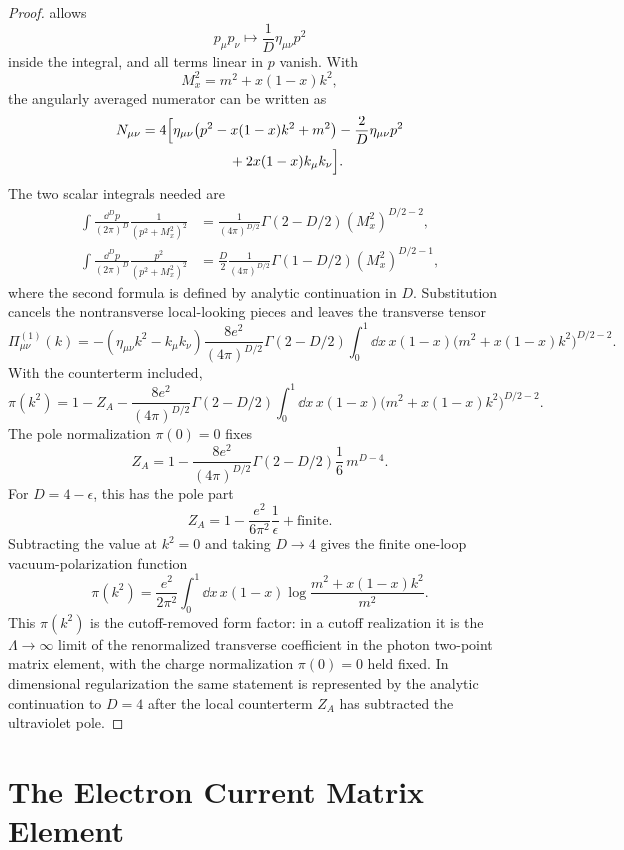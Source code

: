 \begin{proof}
allows
\[
  p_\mu p_\nu\mapsto \frac1D\eta_{\mu\nu}p^2
\]
inside the integral, and all terms linear in \(p\) vanish.  With
\[
  M_x^2=m^2+x(1-x)k^2,
\]
the angularly averaged numerator can be written as
\[
\begin{aligned}
  N_{\mu\nu}
  =
  4\Bigl[
    &\eta_{\mu\nu}\bigl(p^2-x(1-x)k^2+m^2\bigr)
    -\frac2D\eta_{\mu\nu}p^2
\\
    &\qquad\qquad
    +2x(1-x)k_\mu k_\nu
  \Bigr].
\end{aligned}
\]
The two scalar integrals needed are
\[
\begin{aligned}
  \int\frac{\dd^Dp}{(2\pi)^D}\frac1{(p^2+M_x^2)^2}
  &=
  \frac1{(4\pi)^{D/2}}
  \Gamma(2-D/2)(M_x^2)^{D/2-2},\\
  \int\frac{\dd^Dp}{(2\pi)^D}\frac{p^2}{(p^2+M_x^2)^2}
  &=
  \frac{D}{2}\frac1{(4\pi)^{D/2}}
  \Gamma(1-D/2)(M_x^2)^{D/2-1},
\end{aligned}
\]
where the second formula is defined by analytic continuation in \(D\).
Substitution cancels the nontransverse local-looking pieces and leaves the
transverse tensor
\[
  \Pi^{(1)}_{\mu\nu}(k)
  =
  -(\eta_{\mu\nu}k^2-k_\mu k_\nu)
  \frac{8e^2}{(4\pi)^{D/2}}
  \Gamma(2-D/2)
  \int_0^1\dd x\,x(1-x)
  \bigl(m^2+x(1-x)k^2\bigr)^{D/2-2}.
\]
With the counterterm included,
\[
  \pi(k^2)
  =
  1-Z_A
  -
  \frac{8e^2}{(4\pi)^{D/2}}\Gamma(2-D/2)
  \int_0^1\dd x\,x(1-x)
  \bigl(m^2+x(1-x)k^2\bigr)^{D/2-2}.
\]
The pole normalization \(\pi(0)=0\) fixes
\[
  Z_A
  =
  1-
  \frac{8e^2}{(4\pi)^{D/2}}\Gamma(2-D/2)\frac16\,m^{D-4}.
\]
For \(D=4-\epsilon\), this has the pole part
\[
  Z_A=1-\frac{e^2}{6\pi^2}\frac1\epsilon+\text{finite}.
\]
Subtracting the value at \(k^2=0\) and taking \(D\to4\) gives the finite
one-loop vacuum-polarization function
\[
  \pi(k^2)
  =
  \frac{e^2}{2\pi^2}
  \int_0^1\dd x\,x(1-x)
  \log
  \frac{m^2+x(1-x)k^2}{m^2}.
\]
This \(\pi(k^2)\) is the cutoff-removed form factor: in a cutoff
realization it is the \(\Lambda\to\infty\) limit of the renormalized
transverse coefficient in the photon two-point matrix element, with the
charge normalization \(\pi(0)=0\) held fixed.  In dimensional
regularization the same statement is represented by the analytic continuation
to \(D=4\) after the local counterterm \(Z_A\) has subtracted the ultraviolet
pole.
\end{proof}

\section{The Electron Current Matrix Element}

